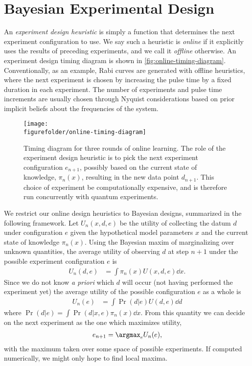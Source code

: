 \documentclass[aps,nofootinbib,twocolumn,superscriptaddress]{revtex4}
\newcommand{\figurefolder}{../fig}
\newcommand{\mps}{x}
\newcommand{\eps}{e}
\newcommand{\data}{d}
\begin{document}
\section{Bayesian Experimental Design}
\label{sec:experimental-design}

An \textit{experiment design heuristic} is simply a function that 
determines the next experiment configuration to use.
We say such a heuristic is \textit{online} if it explicitly uses the 
results of preceding experiments, and we call it \textit{offline} 
otherwise.
An experiment design timing diagram is shown in \autoref{fig:online-timing-diagram}.
Conventionally, as an example, Rabi curves are generated 
with offline heuristics, where the next experiment is chosen by 
increasing the pulse time by a fixed duration in each experiment.
The number of experiments and pulse time increments are usually 
chosen through Nyquist considerations based on prior implicit
beliefs about the frequencies of the system.

\begin{figure*}
    \texttt{[image: \\figurefolder/online-timing-diagram]}
    \caption{Timing diagram for three rounds of online learning. The role of the
    experiment design heuristic is to pick the next experiment configuration 
    $e_{n+1}$, possibly based
    on the current state of knowledge, $\pi_n(\mps)$, resulting in the
    new data point $d_{n+1}$. 
    This choice of experiment be computationally expensive, and is 
    therefore run concurrently with quantum experiments.}
    \label{fig:online-timing-diagram}
\end{figure*}

We restrict our online design heuristics to Bayesian designs,
summarized in the following framework.
Let $U_n(\mps,\data,\eps)$ be the utility of collecting the datum
$\data$ under configuration $\eps$ given the hypothetical
model parameters $\mps$ and the current state of knowledge $\pi_n(\mps)$.
Using the Bayesian maxim of marginalizing over unknown quantities,
the average utility of observing $\data$ at step $n+1$ under 
the possible experiment configuration $\eps$ is
\begin{align}
    U_n(\data,\eps) 
        &= \int \pi_n(\mps)U(\mps,\data,\eps)\dd\mps.
\end{align}
Since we do not know \textit{a priori} which $\data$ will 
occur (not having performed the experiment yet) the average 
utility of the possible configuration $\eps$ as a whole is
\begin{align}
    U_n(\eps) 
        &= \int\Pr(\data|\eps)U(\data,\eps) \dd\data
\end{align}
where $\Pr(\data|\eps)=\int \Pr(\data|\mps,\eps)\pi_n(\mps)\dd\mps$.
From this quantity we can decide on the next experiment as
the one which maximizes utility,
\begin{align}
    \eps_{n+1} = \argmax_\eps U_n(\eps),
\end{align}
with the maximum taken over some space of possible experiments.
If computed numerically, we might only hope to find local maxima.
\end{document}
